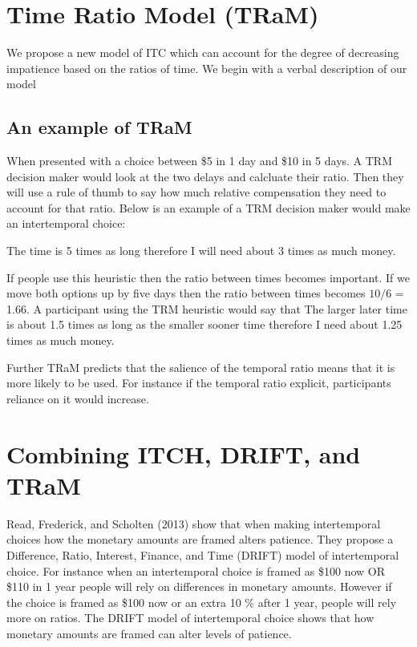 \documentclass[]{article}
\begin{document}
\section{Time Ratio Model (TRaM)}

We propose a new model of ITC which can account for the degree of decreasing impatience based on the ratios of time. 
We begin with a verbal description of our model

\subsection{An example of TRaM}

When presented with a choice between \$5 in 1 day and \$10 in 5 days. 
A TRM decision maker would look at the two delays and calcluate their ratio. 
Then they will use a rule of thumb to say how much relative compensation they need to account for that ratio.
Below is an example of a TRM decision maker would make an intertemporal choice:

The time is 5 times as long therefore I will need about 3 times as much money. 

If people use this heuristic then the ratio between times becomes important. 
If we move both options up by five days then the ratio between times becomes $10/6$ = 1.66. A participant using the TRM heuristic would say that 
The larger later time is about 1.5 times as long as the smaller sooner time therefore I need about 1.25 times as much money. 

Further TRaM predicts that the salience of the temporal ratio means that it is more likely to be used. 
For instance if the temporal ratio explicit, participants reliance on it would increase.



\section{Combining ITCH, DRIFT, and TRaM }

Read, Frederick, and Scholten (2013) show that when making intertemporal choices how the monetary amounts are framed alters patience. 
They propose a Difference, Ratio, Interest, Finance, and Time (DRIFT) model of intertemporal choice. 
For instance when an intertemporal choice is framed as \$100 now OR \$110 in 1 year people will rely on differences in monetary amounts.
However if the choice is framed as \$100 now or an extra 10 \% after 1 year, people will rely more on ratios. 
The DRIFT model of intertemporal choice shows that how monetary amounts are framed can alter levels of patience.
\end{document}
